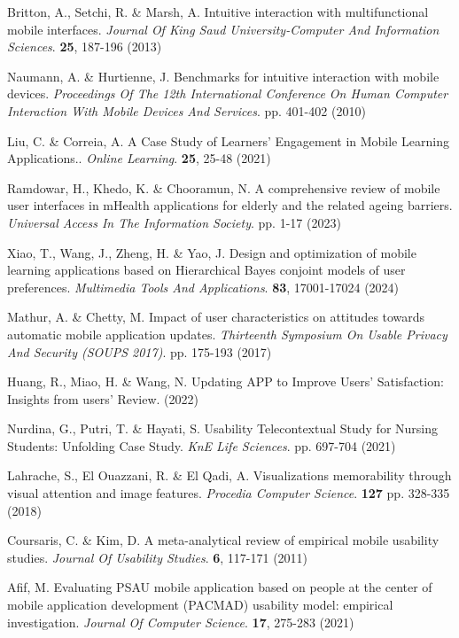 \documentclass[preprint,12pt]{elsarticle}
\begin{document}
\begin{thebibliography}{99}
Britton, A., Setchi, R. \& Marsh, A. Intuitive interaction with multifunctional mobile interfaces. {\em Journal Of King Saud University-Computer And Information Sciences}. \textbf{25}, 187-196 (2013)

Naumann, A. \& Hurtienne, J. Benchmarks for intuitive interaction with mobile devices. {\em Proceedings Of The 12th International Conference On Human Computer Interaction With Mobile Devices And Services}. pp. 401-402 (2010)

Liu, C. \& Correia, A. A Case Study of Learners' Engagement in Mobile Learning Applications.. {\em Online Learning}. \textbf{25}, 25-48 (2021)

Ramdowar, H., Khedo, K. \& Chooramun, N. A comprehensive review of mobile user interfaces in mHealth applications for elderly and the related ageing barriers. {\em Universal Access In The Information Society}. pp. 1-17 (2023)

Xiao, T., Wang, J., Zheng, H. \& Yao, J. Design and optimization of mobile learning applications based on Hierarchical Bayes conjoint models of user preferences. {\em Multimedia Tools And Applications}. \textbf{83}, 17001-17024 (2024)

Mathur, A. \& Chetty, M. Impact of user characteristics on attitudes towards automatic mobile application updates. {\em Thirteenth Symposium On Usable Privacy And Security (SOUPS 2017)}. pp. 175-193 (2017)

Huang, R., Miao, H. \& Wang, N. Updating APP to Improve Users’ Satisfaction: Insights from users’ Review.  (2022)

Nurdina, G., Putri, T. \& Hayati, S. Usability Telecontextual Study for Nursing Students: Unfolding Case Study. {\em KnE Life Sciences}. pp. 697-704 (2021)

Lahrache, S., El Ouazzani, R. \& El Qadi, A. Visualizations memorability through visual attention and image features. {\em Procedia Computer Science}. \textbf{127} pp. 328-335 (2018)

Coursaris, C. \& Kim, D. A meta-analytical review of empirical mobile usability studies. {\em Journal Of Usability Studies}. \textbf{6}, 117-171 (2011)

Afif, M. Evaluating PSAU mobile application based on people at the center of mobile application development (PACMAD) usability model: empirical investigation. {\em Journal Of Computer Science}. \textbf{17}, 275-283 (2021)


\end{thebibliography}
\end{document}
